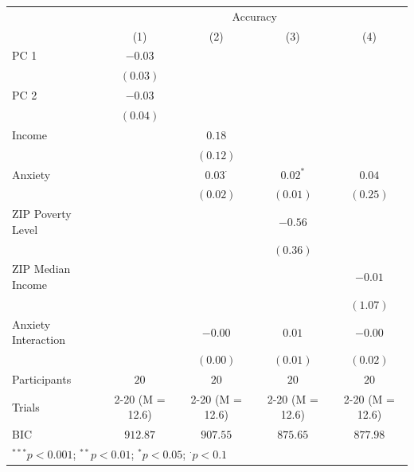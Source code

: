 \documentclass[
]{article}
\begin{document}
\begin{table}
\begin{minipage}[t]{\linewidth}
{\begin{center}
\begin{tabular}{l c c c c}
\hline
 & \multicolumn{4}{c}{Accuracy} \\
\cline{2-5}
 & (1) & (2) & (3) & (4) \\
\hline
PC 1                & $-0.03$         &                 &                 &                 \\
                    & $(0.03)$        &                 &                 &                 \\
PC 2                & $-0.03$         &                 &                 &                 \\
                    & $(0.04)$        &                 &                 &                 \\
Income              &                 & $0.18$          &                 &                 \\
                    &                 & $(0.12)$        &                 &                 \\
Anxiety             &                 & $0.03^{\cdot}$  & $0.02^{*}$      & $0.04$          \\
                    &                 & $(0.02)$        & $(0.01)$        & $(0.25)$        \\
ZIP Poverty Level   &                 &                 & $-0.56$         &                 \\
                    &                 &                 & $(0.36)$        &                 \\
ZIP Median Income   &                 &                 &                 & $-0.01$         \\
                    &                 &                 &                 & $(1.07)$        \\
Anxiety Interaction &                 & $-0.00$         & $0.01$          & $-0.00$         \\
                    &                 & $(0.00)$        & $(0.01)$        & $(0.02)$        \\
\hline
Participants        & $20$            & $20$            & $20$            & $20$            \\
Trials              & 2-20 (M = 12.6) & 2-20 (M = 12.6) & 2-20 (M = 12.6) & 2-20 (M = 12.6) \\
BIC                 & $912.87$        & $907.55$        & $875.65$        & $877.98$        \\
\hline
\multicolumn{5}{l}{\scriptsize{$^{***}p<0.001$; $^{**}p<0.01$; $^{*}p<0.05$; $^{\cdot}p<0.1$}}
\end{tabular}

\label{table:coefficients}
\end{center}

}

\end{minipage}%

\end{table}
\end{document}
